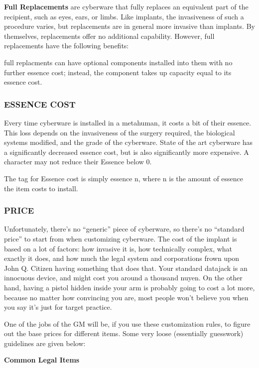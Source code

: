 \documentclass[oneside,10pt]{article}
\begin{document}
\begin{multicols}{2}
\textbf{Full Replacements} are cyberware that fully replaces an
equivalent part of the recipient, such as eyes, ears, or limbs.
Like implants, the invasiveness of such a procedure varies,
but replacements are in general more invasive than implants.
By themselves, replacements offer no additional capability.
However, full replacements have the following benefits:

\begin{dent}

\tcirc{} full replacments can have optional components installed
into them with no further essence cost; instead, the
component takes up capacity equal to its essence cost.
\end{dent}
\subsubsection{ESSENCE COST}
Every time cyberware is installed in a metahuman, it costs a
bit of their essence. This loss depends on the invasiveness of
the surgery required, the biological systems modified, and
the grade of the cyberware. State of the art cyberware has a
significantly decreased essence cost, but is also significantly
more expensive. A character may not reduce their Essence
below 0.

The tag for Essence cost is simply essence n, where n is the
amount of essence the item costs to install.

\subsubsection{PRICE}
Unfortunately, there’s no ``generic'' piece of cyberware, so
there’s no ``standard price'' to start from when customizing
cyberware. The cost of the implant is based on a lot of factors:
how invasive it is, how technically complex, what exactly it
does, and how much the legal system and corporations frown
upon John Q. Citizen having something that does that. Your
standard datajack is an innocuous device, and might cost you
around a thousand nuyen. On the other hand, having a pistol
hidden inside your arm is probably going to cost a lot more,
because no matter how convincing you are, most people
won’t believe you when you say it’s just for target practice.

One of the jobs of the GM will be, if you use these customization rules, to figure out the base prices for different items.
Some very loose (essentially guesswork) guidelines are given
below:

\textbf{Common Legal Items}


\end{multicols}
\end{document}
